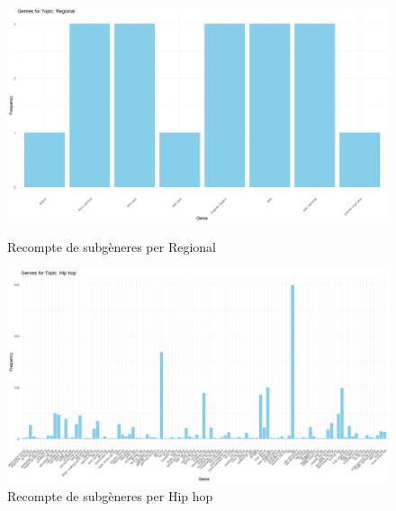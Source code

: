 \begin{figure}[H]
    \centering
    \begin{minipage}{.4\textwidth}
        \centering
        \includegraphics[width=0.95\linewidth]{Images//8_Textual//Genres/Regional_subgenres_freq.png}
    \caption{Recompte de subgèneres per Regional}
    \label{fig:textual_genres_subregional}
    \end{minipage}%
    \begin{minipage}{.4\textwidth}
        \centering
        \includegraphics[width=0.95\linewidth]{Images//8_Textual//Genres/Hip hop_subgenres_freq.png}
    \caption{Recompte de subgèneres per Hip hop}
    \label{fig:textual_genres_subhiphop}
    \end{minipage}%
\end{figure}

